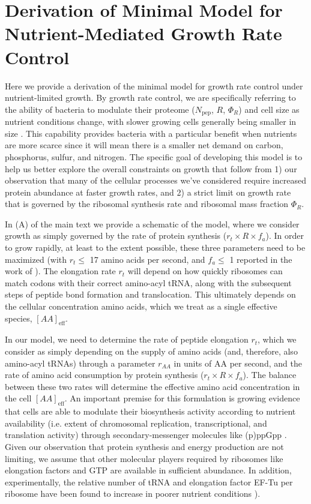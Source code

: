 \section{Derivation of Minimal Model for Nutrient-Mediated Growth Rate Control}
\label{sec:SI_model}

Here we provide a derivation of the minimal model for growth rate control under
nutrient-limited growth. By growth rate control, we are specifically referring
to the ability of bacteria to modulate their proteome ($N_\text{pep}$, $R$,
$\Phi_R$) and cell size as nutrient conditions change, with slower growing cells
generally being smaller in size \citep{ojkic2019}. This capability provides
bacteria with  a particular benefit when nutrients are more scarce since it will
mean there is a  smaller net demand on carbon, phosphorus, sulfur, and nitrogen.
The specific goal  of developing this model is to help us better explore the
overall constraints on  growth that follow from 1) our observation that many  of
the cellular processes we've considered require increased protein abundance at
faster growth rates, and 2) a strict limit on growth rate that is
governed by the ribosomal synthesis rate and ribosomal mass fraction $\Phi_R$.

In (A) of the main text we provide a schematic of the
model, where we consider growth as simply governed by the rate of protein
synthesis ($r_t \times R \times f_a$). In order to grow rapidly, at least to the
extent possible, these three parameters need to be maximized (with $r_t \leq$ 17
amino acids per second, and $f_a \leq$ 1 reported in the work of
\cite{dai2016}). The elongation rate $r_t$ will depend on how quickly
ribosomes can match codons with their correct amino-acyl tRNA, along with the
subsequent steps of peptide bond formation and translocation. This ultimately
depends on the cellular concentration amino acids, which we treat as a single
effective species, $[AA]_\text{eff}$.

In our model, we need to determine the rate of peptide elongation $r_t$, which we
consider as simply depending on the supply of amino acids (and,
therefore, also amino-acyl tRNAs) through a parameter $r_{AA}$ in units of AA
per second, and the rate of amino acid consumption by protein synthesis ($r_t
\times R \times f_a$). The balance between these two rates will determine the
effective amino acid concentration in the cell $[AA]_\text{eff}$. An important
premise for this formulation is growing evidence that cells are able to modulate
their biosynthesis activity according to nutrient availability (i.e. extent of
chromosomal replication, transcriptional, and translation activity) through
secondary-messenger molecules like (p)ppGpp \citep{hauryliuk2015, zhu2019,
kraemer2019, fernandezcoll2020, Buke2020}. Given our observation that protein
synthesis and energy production are not limiting, we assume that other molecular
players required by ribosomes like elongation factors and GTP are available in
sufficient abundance. In addition, experimentally, the relative number of tRNA
and elongation factor EF-Tu per ribosome have been found to increase in poorer
nutrient conditions \cite{pedersen1978, dong1996, klumpp2013}).


